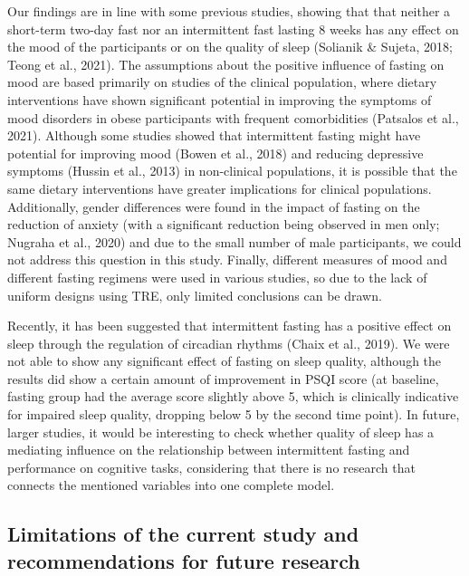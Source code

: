 \documentclass[authordate, empirical]{jote-new-article}
\begin{document}
Our findings are in line with some previous studies, showing that that neither a short-term two-day fast nor an intermittent fast lasting 8 weeks has any effect on the mood of the participants or on the quality of sleep (Solianik \& Sujeta, 2018; Teong et al., 2021). The assumptions about the positive influence of fasting on mood are based primarily on studies of the clinical population, where dietary interventions have shown significant potential in improving the symptoms of mood disorders in obese participants with frequent comorbidities (Patsalos et al., 2021). Although some studies showed that intermittent fasting might have potential for improving mood (Bowen et al., 2018) and reducing depressive symptoms (Hussin et al., 2013) in non-clinical populations, it is possible that the same dietary interventions have greater implications for clinical populations. Additionally, gender differences were found in the impact of fasting on the reduction of anxiety (with a significant reduction being observed in men only; Nugraha et al., 2020) and due to the small number of male participants, we could not address this question in this study. Finally, different measures of mood and different fasting regimens were used in various studies, so due to the lack of uniform designs using TRE, only limited conclusions can be drawn.



Recently, it has been suggested that intermittent fasting has a positive effect on sleep through the regulation of circadian rhythms (Chaix et al., 2019). We were not able to show any significant effect of fasting on sleep quality, although the results did show a certain amount of improvement in PSQI score (at baseline, fasting group had the average score slightly above 5, which is clinically indicative for impaired sleep quality, dropping below 5 by the second time point). In future, larger studies, it would be interesting to check whether quality of sleep has a mediating influence on the relationship between intermittent fasting and performance on cognitive tasks, considering that there is no research that connects the mentioned variables into one complete model.







\subsection{Limitations of the current study and recommendations for future research}
\end{document}
